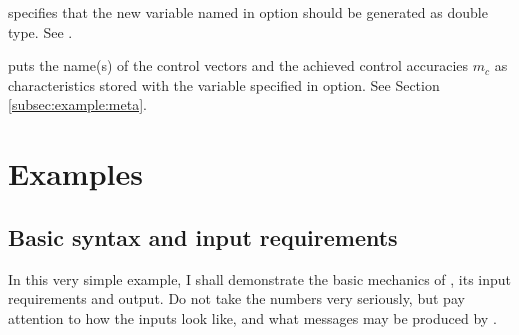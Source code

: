 \hangpara
{} specifies that the new variable named in 
option should be generated as double type. See .


\hangpara
{} puts the name(s) of the control vectors and the achieved control
    accuracies $m_c$ as characteristics stored with the variable specified in
     option. See Section \ref{subsec:example:meta}.


\section{Examples}

\subsection{Basic syntax and input requirements}

In this very simple example, I shall demonstrate the basic mechanics of
, its input requirements and output. Do not take the numbers
very seriously, but pay attention to how the inputs look like, and what
messages may be produced by .


